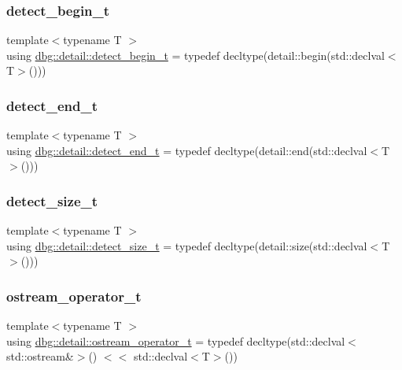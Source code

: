 \subsubsection{\texorpdfstring{detect\+\_\+begin\+\_\+t}{detect\_begin\_t}}
{\footnotesize\ttfamily template$<$typename T $>$ \\
using \hyperlink{namespacedbg_1_1detail_acfad41bd0b116575799b79d85fc5c883}{dbg\+::detail\+::detect\+\_\+begin\+\_\+t} = typedef decltype(detail\+::begin(std\+::declval$<$T$>$()))}

\mbox{\label{namespacedbg_1_1detail_ab462e0c9e2d1686d323d638613692839}} 
\subsubsection{\texorpdfstring{detect\+\_\+end\+\_\+t}{detect\_end\_t}}
{\footnotesize\ttfamily template$<$typename T $>$ \\
using \hyperlink{namespacedbg_1_1detail_ab462e0c9e2d1686d323d638613692839}{dbg\+::detail\+::detect\+\_\+end\+\_\+t} = typedef decltype(detail\+::end(std\+::declval$<$T$>$()))}

\mbox{\label{namespacedbg_1_1detail_a19adefcfcaddecb9f32e810ebcae4856}} 
\subsubsection{\texorpdfstring{detect\+\_\+size\+\_\+t}{detect\_size\_t}}
{\footnotesize\ttfamily template$<$typename T $>$ \\
using \hyperlink{namespacedbg_1_1detail_a19adefcfcaddecb9f32e810ebcae4856}{dbg\+::detail\+::detect\+\_\+size\+\_\+t} = typedef decltype(detail\+::size(std\+::declval$<$T$>$()))}

\mbox{\label{namespacedbg_1_1detail_a2c6a2bc0c8581b3b0d285d1d2971e44d}} 
\subsubsection{\texorpdfstring{ostream\+\_\+operator\+\_\+t}{ostream\_operator\_t}}
{\footnotesize\ttfamily template$<$typename T $>$ \\
using \hyperlink{namespacedbg_1_1detail_a2c6a2bc0c8581b3b0d285d1d2971e44d}{dbg\+::detail\+::ostream\+\_\+operator\+\_\+t} = typedef decltype(std\+::declval$<$std\+::ostream\&$>$() $<$$<$ std\+::declval$<$T$>$())}

